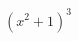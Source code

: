 \documentclass[preview]{standalone}
\begin{document}
\begin{align*}
(x^2 + 1)^3
\end{align*}
\end{document}
